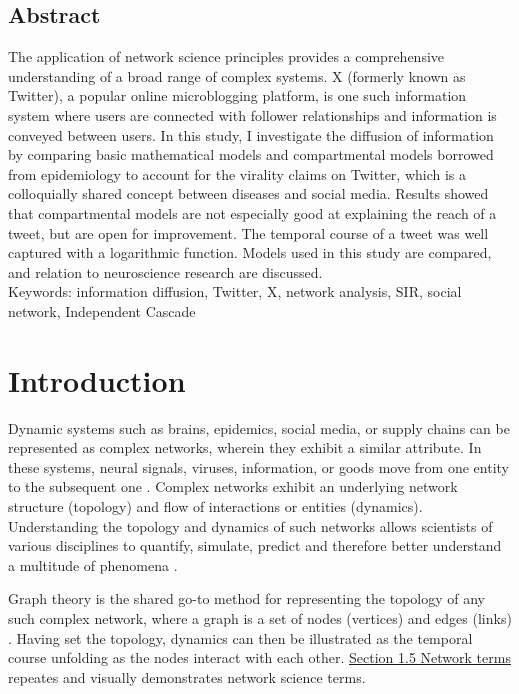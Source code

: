 \documentclass[11pt,a4paper]{article}
\begin{document}
\newpage 
\begin{center}
    \section*{Abstract}     
\end{center}
The application of network science principles provides a comprehensive understanding of a broad range of complex systems. X (formerly known as Twitter), a popular online microblogging platform, is one such information system where users are connected with follower relationships and information is conveyed between users. In this study, I investigate the diffusion of information by comparing basic mathematical models and compartmental models borrowed from epidemiology to account for the virality claims on Twitter, which is a colloquially shared concept between diseases and social media. Results showed that compartmental models are not especially good at explaining the reach of a tweet, but are open for improvement. The temporal course of a tweet was well captured with a logarithmic function. Models used in this study are compared, and relation to neuroscience research are discussed. \\

Keywords: information diffusion, Twitter, X, network analysis, SIR, social network, Independent Cascade

\newpage
\tableofcontents

\newpage
\section{Introduction}
Dynamic systems such as brains, epidemics, social media, or supply chains can be represented as complex networks, wherein they exhibit a similar attribute. In these systems, neural signals, viruses, information, or goods move from one entity to the subsequent one \cite{lewis_network_2011, strogatz_exploring_2001}. Complex networks exhibit an underlying network structure (topology) and flow of interactions or entities (dynamics). Understanding the topology and dynamics of such networks allows scientists of various disciplines to quantify, simulate, predict and therefore better understand a multitude of phenomena \cite{boccaletti_complex_2006}.

Graph theory is the shared go-to method for representing the topology of any such complex network, where a graph is a set of nodes (vertices) and edges (links) \cite{boccaletti_complex_2006}. Having set the topology, dynamics can then be illustrated as the temporal course unfolding as the nodes interact with each other. \hyperlink{sec:network-terms}{Section 1.5 Network terms} repeates and visually demonstrates network science terms.
    
\end{document}
